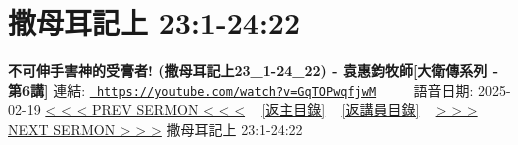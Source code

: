 \documentclass{book}
\begin{document}
\section{撒母耳記上 23:1-24:22}
\label{sec:GqTOPwqfjwM}
\textbf{不可伸手害神的受膏者! (撒母耳記上23\_1-24\_22) - 袁惠鈞牧師[大衛傳系列 - 第6講]}
\newline
\newline
連結: \href{https://youtube.com/watch?v=GqTOPwqfjwM}{\texttt{ https://youtube.com/watch?v=GqTOPwqfjwM}} ~~~~ 語音日期: 2025-02-19 
\newline
\newline
\hyperref[sec:WCt7vYrgwVY]{< < < PREV SERMON < < <}
~
\hyperlink{toc}{[返主目錄]}
~
\hyperref[ch:preacher6]{[返講員目錄]}
~
\hyperref[sec:9ORA5941xxk]{> > > NEXT SERMON > > >}
\newline
\newline
撒母耳記上 23:1-24:22
\newline
\end{document}

